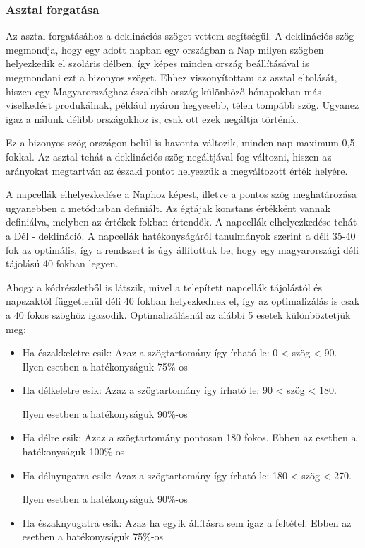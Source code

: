 \documentclass[
]{thesis-ekf}
\theoremstyle{definition}
\theoremstyle{remark}
\begin{document}
			\subsubsection{Asztal forgatása}
				\par Az asztal forgatásához a deklinációs\cite{Kornyezet} szöget vettem segítségül. A deklinációs szög megmondja, hogy egy adott napban egy országban a Nap milyen szögben helyezkedik el szoláris délben, így képes minden ország beállításával is megmondani ezt a bizonyos szöget. Ehhez viszonyítottam az asztal eltolását, hiszen egy Magyarországhoz északibb ország különböző hónapokban más viselkedést produkálnak, például nyáron hegyesebb, télen tompább szög. Ugyanez igaz a nálunk délibb országokhoz is, csak ott ezek negáltja történik. 
				\par Ez a bizonyos szög országon belül is havonta változik, minden nap maximum 0,5 fokkal. Az asztal tehát a deklinációs szög negáltjával fog változni, hiszen az arányokat megtartván az északi pontot helyezzük a megváltozott érték helyére.
				
				\par A napcellák elhelyezkedése a Naphoz képest, illetve a pontos szög meghatározása ugyanebben a metódusban definiált. Az égtájak konstans értékként vannak definiálva, melyben az értékek fokban értendők. A napcellák elhelyezkedése tehát a Dél - deklináció. A napcellák hatékonyságáról\cite{gershoj} tanulmányok szerint a déli 35-40 fok az optimális, így a rendszert is úgy állítottuk be, hogy egy magyarországi déli tájolású 40 fokban legyen.
				
				\par Ahogy a kódrészletből is látszik, mivel a telepített napcellák tájolástól és napszaktól függetlenül déli 40 fokban helyezkednek el, így az optimalizálás is csak a 40 fokos szöghöz igazodik. Optimalizálásnál az alábbi 5 esetek különböztetjük meg:
				\begin{itemize}
					\item Ha északkeletre esik: Azaz a szögtartomány így írható le: 0 < szög < 90. Ilyen esetben a hatékonyságuk 75\%-os
					\item Ha délkeletre esik: Azaz a szögtartomány így írható le: 90 < szög < 180.
					\par Ilyen esetben a hatékonyságuk 90\%-os
					\item Ha délre esik: Azaz a szögtartomány pontosan 180 fokos. Ebben az esetben a hatékonyságuk 100\%-os
					\item Ha délnyugatra esik: Azaz a szögtartomány így írható le: 180 < szög < 270.
					\par Ilyen esetben a hatékonyságuk 90\%-os
					\item Ha északnyugatra esik: Azaz ha egyik állításra sem igaz a feltétel. Ebben az esetben a hatékonyságuk 75\%-os
				\end{itemize}
				
\end{document}
